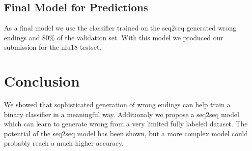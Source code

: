 \documentclass{article}
\begin{document}
\subsection{Final Model for Predictions}

As a final model we use the classifier trained on the seq2seq generated wrong endings and 80\% of the validation set. With this model we produced our submission for the nlu18-testset.

\section{Conclusion}

We showed that sophisticated generation of wrong endings can help train a binary classifier in a meaningful way. Additionaly we propose a seq2seq model which can learn to generate wrong from a very limited fully labeled dataset. The potential of the seq2seq model has been shown, but a more complex model could probably reach a much higher accuracy.



\end{document}

